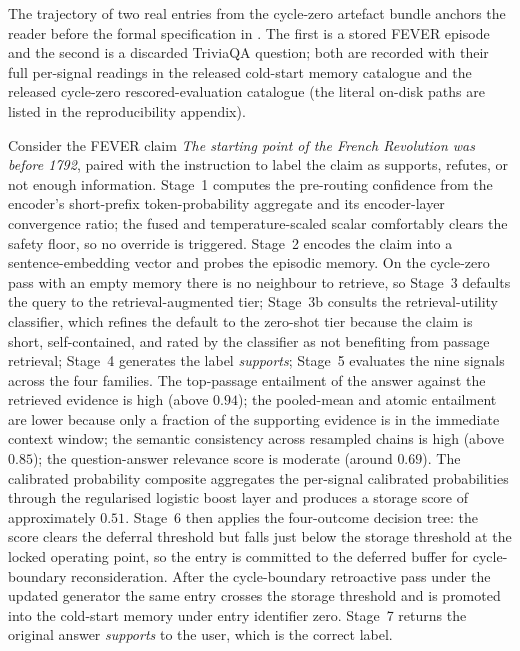 The trajectory of two real entries from the cycle-zero artefact bundle anchors the reader before the formal specification in . The first is a stored FEVER episode and the second is a discarded TriviaQA question; both are recorded with their full per-signal readings in the released cold-start memory catalogue and the released cycle-zero rescored-evaluation catalogue (the literal on-disk paths are listed in the reproducibility appendix).

Consider the FEVER claim \emph{The starting point of the French Revolution was before 1792}, paired with the instruction to label the claim as supports, refutes, or not enough information. Stage~1 computes the pre-routing confidence from the encoder's short-prefix token-probability aggregate and its encoder-layer convergence ratio; the fused and temperature-scaled scalar comfortably clears the safety floor, so no override is triggered. Stage~2 encodes the claim into a sentence-embedding vector and probes the episodic memory. On the cycle-zero pass with an empty memory there is no neighbour to retrieve, so Stage~3 defaults the query to the retrieval-augmented tier; Stage~3b consults the retrieval-utility classifier, which refines the default to the zero-shot tier because the claim is short, self-contained, and rated by the classifier as not benefiting from passage retrieval; Stage~4 generates the label \emph{supports}; Stage~5 evaluates the nine signals across the four families. The top-passage entailment of the answer against the retrieved evidence is high (above $0.94$); the pooled-mean and atomic entailment are lower because only a fraction of the supporting evidence is in the immediate context window; the semantic consistency across resampled chains is high (above $0.85$); the question-answer relevance score is moderate (around $0.69$). The calibrated probability composite aggregates the per-signal calibrated probabilities through the regularised logistic boost layer and produces a storage score of approximately $0.51$. Stage~6 then applies the four-outcome decision tree: the score clears the deferral threshold but falls just below the storage threshold at the locked operating point, so the entry is committed to the deferred buffer for cycle-boundary reconsideration. After the cycle-boundary retroactive pass under the updated generator the same entry crosses the storage threshold and is promoted into the cold-start memory under entry identifier zero. Stage~7 returns the original answer \emph{supports} to the user, which is the correct label.


